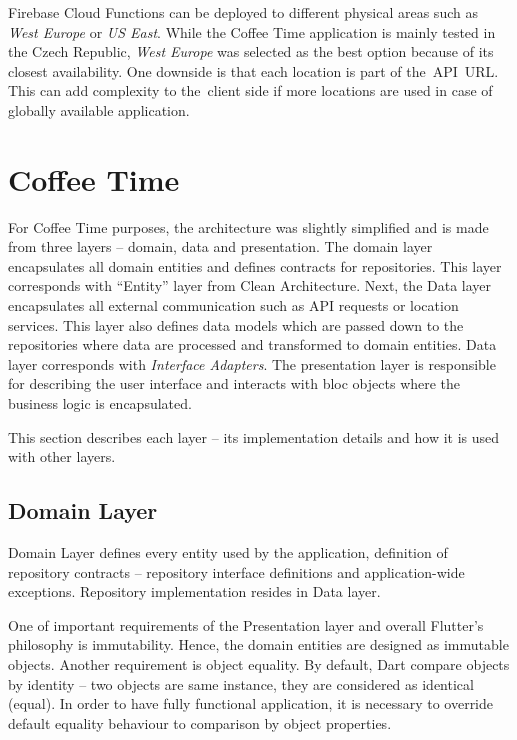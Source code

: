 Firebase Cloud Functions can be deployed to different physical areas such as \textit{West Europe} or \textit{US East}. While the Coffee Time application is mainly tested in the Czech Republic, \textit{West Europe} was selected as the best option because of its closest availability. One downside is that each location is part of the~API~URL. This can add complexity to the~client side if more locations are used in case of globally available application. 

\section{Coffee Time}
For Coffee Time purposes, the architecture was slightly simplified and is made from three layers -- domain, data and presentation. The domain layer encapsulates all domain entities and defines contracts for repositories. This layer corresponds with ``Entity'' layer from Clean Architecture. Next, the Data layer encapsulates all external communication such as API requests or location services. This layer also defines data models which are passed down to the repositories where data are processed and transformed to domain entities. Data layer corresponds with \textit{Interface Adapters}. The presentation layer is responsible for describing the user interface and interacts with \gls{bloc} objects where the business logic is encapsulated.

This section describes each layer -- its implementation details and how it is used with other layers.  
\subsection{Domain Layer}
Domain Layer defines every entity used by the application, definition of repository contracts -- repository interface definitions and application-wide exceptions. Repository implementation resides in Data layer. 

One of important requirements of the Presentation layer and overall Flutter's philosophy is immutability. Hence, the domain entities are designed as immutable objects. Another requirement is object equality. By default, Dart compare objects by identity -- two objects are same instance, they are considered as identical (equal). In order to have fully functional application, it is necessary to override default equality behaviour to comparison by object properties. 


